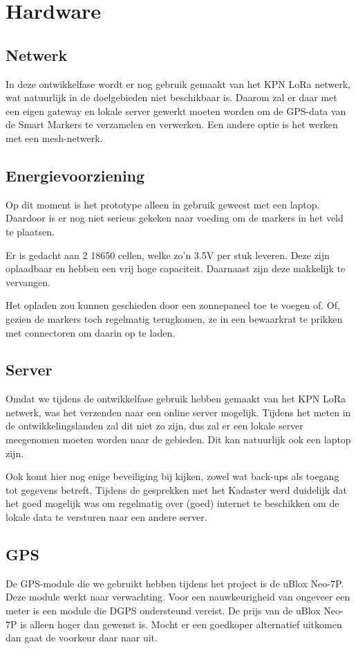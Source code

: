 \section{Hardware}

\subsection{Netwerk}
In deze ontwikkelfase wordt er nog gebruik gemaakt van het KPN LoRa netwerk, wat
natuurlijk in de doelgebieden niet beschikbaar is. Daarom zal er daar met een eigen
gateway en lokale server gewerkt moeten worden om de GPS-data van de Smart Markers
te verzamelen en verwerken. Een andere optie is het werken met een mesh-netwerk.

\subsection{Energievoorziening}
Op dit moment is het prototype alleen in gebruik geweest met een laptop. Daardoor
is er nog niet serieus gekeken naar voeding om de markers in het veld te plaatsen.

Er is gedacht aan 2 18650 cellen, welke zo'n 3.5V per stuk leveren. Deze zijn
oplaadbaar en hebben een vrij hoge capaciteit. Daarnaast zijn deze makkelijk te
vervangen.

Het opladen zou kunnen geschieden door een zonnepaneel toe te voegen of. Of, gezien
de markers toch regelmatig terugkomen, ze in een bewaarkrat te prikken met connectoren
om daarin op te laden.

\subsection{Server}
Omdat we tijdens de ontwikkelfase gebruik hebben gemaakt van het KPN LoRa netwerk, was
het verzenden naar een online server mogelijk.
Tijdens het meten in de ontwikkelingslanden zal dit niet zo zijn, dus zal er een lokale
server meegenomen moeten worden naar de gebieden. Dit kan natuurlijk ook een laptop zijn.

Ook komt hier nog enige beveiliging bij kijken, zowel wat back-ups als toegang tot
gegevens betreft. Tijdens de gesprekken met het Kadaster werd duidelijk dat het goed
mogelijk was om regelmatig over (goed) internet te beschikken om de lokale data te
versturen naar een andere server.

\subsection{GPS}
De GPS-module die we gebruikt hebben tijdens het project is de uBlox Neo-7P.
Deze module werkt naar verwachting. Voor een nauwkeurigheid van ongeveer een
meter is een module die DGPS ondersteund vereist. De prijs van de uBlox Neo-7P
is alleen hoger dan gewenst is. Mocht er een goedkoper alternatief uitkomen dan
gaat de voorkeur daar naar uit. 

